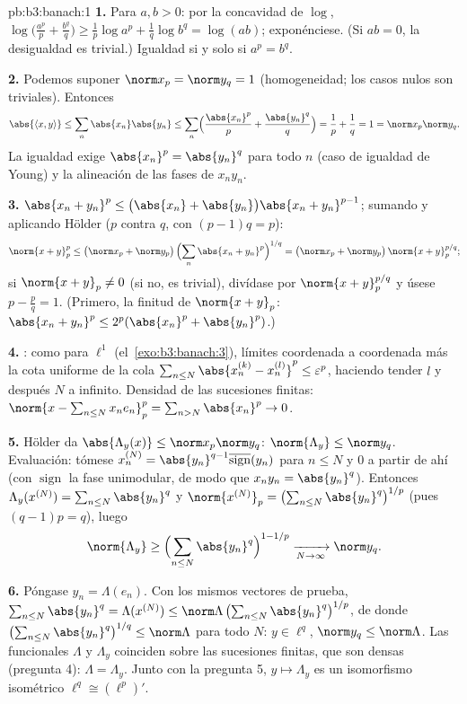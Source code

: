\begin{solution}{pb:b3:banach:1}
\textbf{1.} Para $a, b > 0$: por la concavidad de $\log$,
$\log\bigl(\tfrac{a^p}p + \tfrac{b^q}q\bigr) \geq \tfrac1p\log
a^p + \tfrac1q\log b^q = \log(ab)$; exponénciese. (Si $ab = 0$, la
desigualdad es trivial.) Igualdad si y solo si $a^p = b^q$.

\textbf{2.} Podemos suponer $\norm x_p = \norm y_q = 1$ (homogeneidad;
los casos nulos son triviales). Entonces
\[
\abs{\langle x, y\rangle} \leq \sum_n\abs{x_n}\abs{y_n}
\leq \sum_n\Bigl(\frac{\abs{x_n}^p}p +
\frac{\abs{y_n}^q}q\Bigr) = \frac1p + \frac1q = 1 =
\norm x_p\norm y_q .
\]
La igualdad exige $\abs{x_n}^p = \abs{y_n}^q$ para todo $n$ (caso de
igualdad de Young) y la alineación de las fases de
$x_ny_n$.

\textbf{3.} $\abs{x_n + y_n}^p \leq \bigl(\abs{x_n} +
\abs{y_n}\bigr)\abs{x_n + y_n}^{p-1}$; sumando y aplicando Hölder ($p$
contra $q$, con $(p - 1)q = p$):
\[
\norm{x + y}_p^p \leq \bigl(\norm x_p + \norm
y_p\bigr)\,\Bigl(\sum_n\abs{x_n + y_n}^{p}\Bigr)^{1/q}
= \bigl(\norm x_p + \norm y_p\bigr)\,\norm{x+y}_p^{p/q};
\]
si $\norm{x + y}_p \neq 0$ (si no, es trivial), divídase por
$\norm{x+y}_p^{p/q}$ y úsese $p - \frac pq = 1$. (Primero, la finitud de
$\norm{x+y}_p$: $\abs{x_n+y_n}^p \leq
2^p(\abs{x_n}^p + \abs{y_n}^p)$.)

\textbf{4.} : como para
$\ell^1$ (el~\cref{exo:b3:banach:3}), límites coordenada a coordenada
más la cota uniforme de la cola
$\sum_{n\leq N}\abs{x^{(k)}_n - x^{(l)}_n}^p
\leq \varepsilon^p$, haciendo tender $l$ y después $N$ a infinito.
Densidad de las sucesiones finitas: $\norm{x - \sum_{n\leq
N}x_ne_n}_p^p = \sum_{n > N}\abs{x_n}^p \to 0$.

\textbf{5.} Hölder da $\abs{\Lambda_y(x)} \leq \norm
x_p\norm y_q$: $\norm{\Lambda_y} \leq \norm y_q$. Evaluación: tómese
$x^{(N)}_n = \abs{y_n}^{q-1}\overline{\operatorname{sign}}(y_n)$
para $n \leq N$ y $0$ a partir de ahí (con $\operatorname{sign}$ la fase
unimodular, de modo que $x_ny_n = \abs{y_n}^q$). Entonces
$\Lambda_y(x^{(N)}) = \sum_{n\leq N}\abs{y_n}^q$ y
$\norm{x^{(N)}}_p = \bigl(\sum_{n\leq
N}\abs{y_n}^{q}\bigr)^{1/p}$ (pues $(q-1)p = q$), luego
\[
\norm{\Lambda_y} \geq \Bigl(\sum_{n\leq
N}\abs{y_n}^q\Bigr)^{1 - 1/p} \xrightarrow[N\to\infty]{}
\norm y_q .
\]

\textbf{6.} Póngase $y_n = \Lambda(e_n)$. Con los mismos vectores de
prueba, $\sum_{n \leq N}\abs{y_n}^q = \Lambda(x^{(N)}) \leq
\norm\Lambda\,\bigl(\sum_{n\leq N}\abs{y_n}^q\bigr)^{1/p}$, de donde
$\bigl(\sum_{n\leq N}\abs{y_n}^q\bigr)^{1/q} \leq
\norm\Lambda$ para todo $N$: $y \in \ell^q$, $\norm y_q \leq
\norm\Lambda$. Las funcionales $\Lambda$ y $\Lambda_y$ coinciden sobre
las sucesiones finitas, que son densas (pregunta 4): $\Lambda =
\Lambda_y$. Junto con la pregunta 5, $y \mapsto \Lambda_y$ es un
isomorfismo isométrico $\ell^q \cong (\ell^p)'$.


\end{solution}

